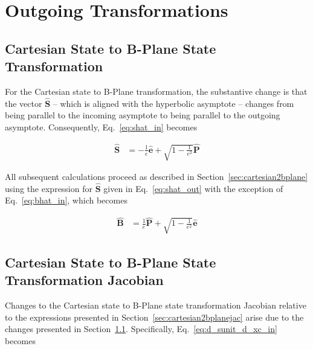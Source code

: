 \documentclass[]{article}
\newcommand{\vbh}[1]{\hat{\bm{#1}}} %
\begin{document}
\section{Outgoing Transformations}
\label{sec:outgoing_transformations}

\subsection{Cartesian State to B-Plane State Transformation}
\label{sec:cartesian2bplane_outgoing}

For the Cartesian state to B-Plane transformation, the substantive change is that the vector $\vbh{S}$ -- which is aligned with the hyperbolic asymptote -- changes from being parallel to the incoming asymptote to being parallel to the outgoing asymptote. Consequently, Eq.~\eqref{eq:shat_in} becomes

\begin{align}
	\label{eq:shat_out}
	\vbh{S} &= -\frac{1}{e} \vbh{e} + \sqrt{1 - \frac{1}{e^2}} \vbh{P}
\end{align}

All subsequent calculations proceed as described in Section~\ref{sec:cartesian2bplane} using the expression for $\vbh{S}$ given in Eq.~\eqref{eq:shat_out} with the exception of Eq.~\eqref{eq:bhat_in}, which becomes

\begin{align}
	\vbh{B} &= \frac{1}{e} \vbh{P} + \sqrt{1 - \frac{1}{e^2}} \vbh{e}
\end{align}

\subsection{Cartesian State to B-Plane State Transformation Jacobian}
\label{sec:cartesian2bplanejac_outgoing}

Changes to the Cartesian state to B-Plane state transformation Jacobian relative to the expressions presented in Section~\ref{sec:cartesian2bplanejac} arise due to the changes presented in Section~\ref{sec:cartesian2bplane_outgoing}. Specifically, Eq.~\eqref{eq:d_sunit_d_xc_in} becomes
\end{document}
